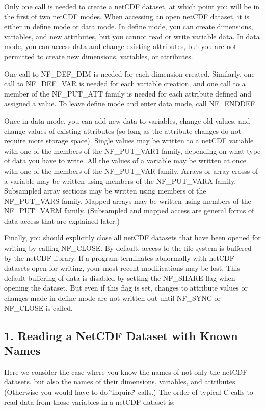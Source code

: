 Only one call is needed to create a net\+C\+DF dataset, at which point you will be in the first of two net\+C\+DF modes. When accessing an open net\+C\+DF dataset, it is either in define mode or data mode. In define mode, you can create dimensions, variables, and new attributes, but you cannot read or write variable data. In data mode, you can access data and change existing attributes, but you are not permitted to create new dimensions, variables, or attributes.

One call to N\+F\+\_\+\+D\+E\+F\+\_\+\+D\+IM is needed for each dimension created. Similarly, one call to N\+F\+\_\+\+D\+E\+F\+\_\+\+V\+AR is needed for each variable creation, and one call to a member of the N\+F\+\_\+\+P\+U\+T\+\_\+\+A\+TT family is needed for each attribute defined and assigned a value. To leave define mode and enter data mode, call N\+F\+\_\+\+E\+N\+D\+D\+EF.

Once in data mode, you can add new data to variables, change old values, and change values of existing attributes (so long as the attribute changes do not require more storage space). Single values may be written to a net\+C\+DF variable with one of the members of the N\+F\+\_\+\+P\+U\+T\+\_\+\+V\+A\+R1 family, depending on what type of data you have to write. All the values of a variable may be written at once with one of the members of the N\+F\+\_\+\+P\+U\+T\+\_\+\+V\+AR family. Arrays or array crosss of a variable may be written using members of the N\+F\+\_\+\+P\+U\+T\+\_\+\+V\+A\+RA family. Subsampled array sections may be written using members of the N\+F\+\_\+\+P\+U\+T\+\_\+\+V\+A\+RS family. Mapped arrays may be written using members of the N\+F\+\_\+\+P\+U\+T\+\_\+\+V\+A\+RM family. (Subsampled and mapped access are general forms of data access that are explained later.)

Finally, you should explicitly close all net\+C\+DF datasets that have been opened for writing by calling N\+F\+\_\+\+C\+L\+O\+SE. By default, access to the file system is buffered by the net\+C\+DF library. If a program terminates abnormally with net\+C\+DF datasets open for writing, your most recent modifications may be lost. This default buffering of data is disabled by setting the N\+F\+\_\+\+S\+H\+A\+RE flag when opening the dataset. But even if this flag is set, changes to attribute values or changes made in define mode are not written out until N\+F\+\_\+\+S\+Y\+NC or N\+F\+\_\+\+C\+L\+O\+SE is called.\hypertarget{nc_f77_interface_guide_f77_Reading_a_NetCDF_Dataset_with_Known_Names}{}\subsection{1. Reading a Net\+C\+D\+F Dataset with Known Names }\label{nc_f77_interface_guide_f77_Reading_a_NetCDF_Dataset_with_Known_Names}
Here we consider the case where you know the names of not only the net\+C\+DF datasets, but also the names of their dimensions, variables, and attributes. (Otherwise you would have to do \char`\"{}inquire\char`\"{} calls.) The order of typical C calls to read data from those variables in a net\+C\+DF dataset is\+:

